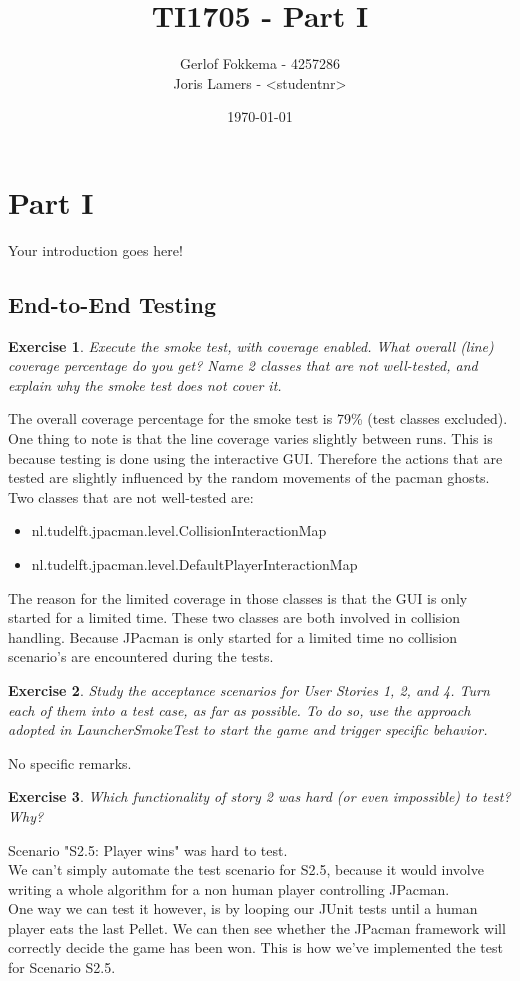 \documentclass[a4paper]{article}
\title{TI1705 - Part I}
\author{Gerlof Fokkema - 4257286\\
		Joris Lamers - \textless studentnr\textgreater}
\date{\today}
\newtheorem{thm}{Exercise}
\begin{document}
  \maketitle
  \section{Part I}
    Your introduction goes here!
      
  \subsection{End-to-End Testing}
    \begin{thm}
      Execute the smoke test, with coverage enabled. What overall (line) coverage percentage do you get? Name 2 classes that are not well-tested, and explain why the smoke test does not cover it.
    \end{thm}    
    The overall coverage percentage for the smoke test is 79\% (test classes excluded). \\
    One thing to note is that the line coverage varies slightly between runs. This is because testing is done using the interactive GUI. Therefore the actions that are tested are slightly influenced by the random movements of the pacman ghosts. \\
    Two classes that are not well-tested are:
    \begin{itemize}
      \item nl.tudelft.jpacman.level.CollisionInteractionMap
      \item nl.tudelft.jpacman.level.DefaultPlayerInteractionMap
    \end{itemize}
    The reason for the limited coverage in those classes is that the GUI is only started for a limited time. These two classes are both involved in collision handling. Because JPacman is only started for a limited time no collision scenario's are encountered during the tests.


    \begin{thm}
      Study the acceptance scenarios for User Stories 1, 2, and 4. Turn each of them into a test case, as far as possible. To do so, use the approach adopted in LauncherSmokeTest to start the game and trigger specific behavior.
    \end{thm}
    No specific remarks.


    \begin{thm}
      Which functionality of story 2 was hard (or even impossible) to test? Why?
    \end{thm}
    Scenario "S2.5: Player wins" was hard to test. \\
    We can't simply automate the test scenario for S2.5, because it would involve writing a whole algorithm for a non human player controlling JPacman. \\
    One way we can test it however, is by looping our JUnit tests until a human player eats the last Pellet. We can then see whether the JPacman framework will correctly decide the game has been won. This is how we've implemented the test for Scenario S2.5.
\end{document}
